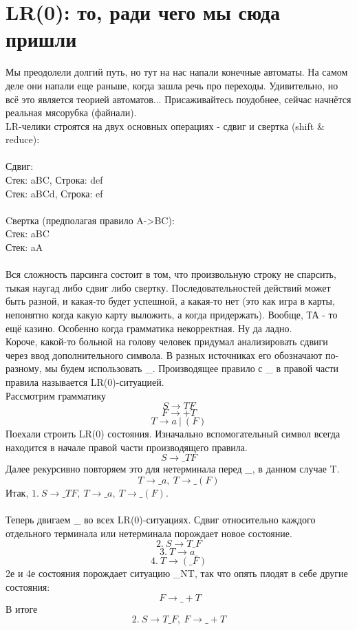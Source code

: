 \documentclass{article}
\begin{document}
\part{LR(0): то, ради чего мы сюда пришли}
Мы преодолели долгий путь, но тут на нас напали конечные автоматы. На самом деле они напали
еще раньше, когда зашла речь про переходы. Удивительно, но всё это является теорией автоматов...
Присаживайтесь поудобнее, сейчас начнётся реальная мясорубка (файнали).\\
LR-челики строятся на двух основных операциях - сдвиг и свертка (shift \& reduce):\\\\
Сдвиг:\\
Стек: aBC, Строка: def\\
Стек: aBCd, Строка: ef\\
\\
Cвертка (предполагая правило A->BC):\\
Стек: aBC\\
Стек: aA\\
\\
Вся сложность парсинга состоит в том, что произвольную строку не спарсить, 
тыкая наугад либо сдвиг либо свертку. Последовательностей действий 
может быть разной, и какая-то будет успешной, а какая-то нет (это как 
игра в карты, непонятно когда какую карту выложить, а когда придержать). 
Вообще, ТА - то ещё казино. Особенно когда грамматика некорректная.
Ну да ладно.\\
Короче, какой-то больной на голову человек придумал анализировать сдвиги
через ввод дополнительного символа. В разных источниках его обозначают
по-разному, мы будем использовать \_. Производящее правило 
с \_ в правой части правила называется LR(0)-ситуацией.\\
Рассмотрим грамматику
$$S\to TF$$
$$F\to +T$$
$$T\to a \ | \ (F)$$
Поехали строить LR(0) состояния. Изначально вспомогательный символ 
всегда находится в начале правой части производящего правила.
$$S\to \_TF$$
Далее рекурсивно повторяем это для нетерминала перед \_, в данном случае T.
$$T\to \_a, \ T\to \_(F)$$
Итак, $1. \ S\to \_TF, \ T\to \_a, \ T\to \_(F)$.\\\\
Теперь двигаем \_ во всех LR(0)-ситуациях. Сдвиг относительно 
каждого отдельного терминала или нетерминала порождает новое состояние.
$$2. \ S\to T\_F$$
$$3. \ T\to a\_$$
$$4. \ T\to (\_F)$$
2е и 4е состояния порождает ситуацию \_NT, так что опять плодят в себе
другие состояния:
$$\ F\to \_+T$$
В итоге
$$2. \ S\to T\_F, \ F\to \_+T$$
\end{document}
